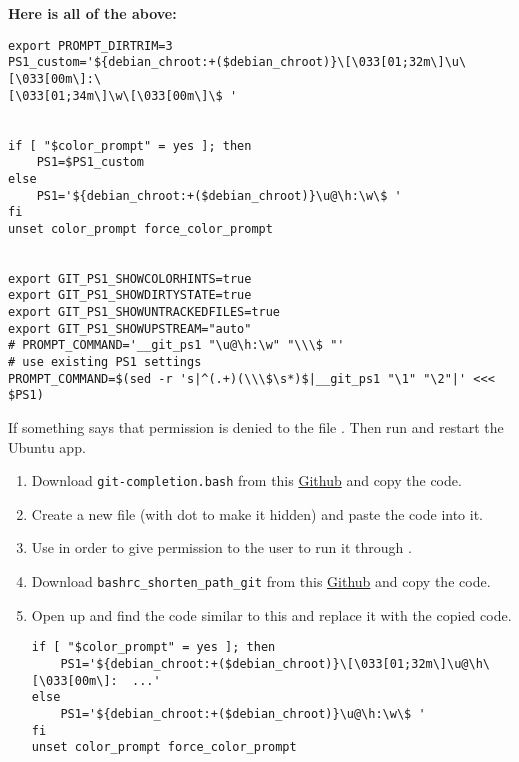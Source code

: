 \newpage
\textbf{Here is all of the above:}
\begin{verbatim}
export PROMPT_DIRTRIM=3
PS1_custom='${debian_chroot:+($debian_chroot)}\[\033[01;32m\]\u\[\033[00m\]:\
[\033[01;34m\]\w\[\033[00m\]\$ '


if [ "$color_prompt" = yes ]; then
    PS1=$PS1_custom
else
    PS1='${debian_chroot:+($debian_chroot)}\u@\h:\w\$ '
fi
unset color_prompt force_color_prompt


export GIT_PS1_SHOWCOLORHINTS=true
export GIT_PS1_SHOWDIRTYSTATE=true
export GIT_PS1_SHOWUNTRACKEDFILES=true
export GIT_PS1_SHOWUPSTREAM="auto"
# PROMPT_COMMAND='__git_ps1 "\u@\h:\w" "\\\$ "'
# use existing PS1 settings
PROMPT_COMMAND=$(sed -r 's|^(.+)(\\\$\s*)$|__git_ps1 "\1" "\2"|' <<< $PS1)
\end{verbatim}

If something says that permission is denied to the file . Then run  and restart the Ubuntu app.


\begin{enumerate}
    \item Download \texttt{git-completion.bash} from this \href{https://github.com/robinhellmers/computer_setup/tree/master/bash_path}{Github} and copy the code.
    
    \item Create a new file  (with dot to make it hidden) and paste the code into it.
    
    \item Use  in order to give permission to the user to run it through .
    
    \item Download \texttt{bashrc\_shorten\_path\_git} from this \href{https://github.com/robinhellmers/computer_setup/tree/master/bash_path}{Github} and copy the code.
    
    \item Open up  and find the code similar to this and replace it with the copied code.
\begin{verbatim}
if [ "$color_prompt" = yes ]; then
    PS1='${debian_chroot:+($debian_chroot)}\[\033[01;32m\]\u@\h\[\033[00m\]:  ...'
else
    PS1='${debian_chroot:+($debian_chroot)}\u@\h:\w\$ '
fi
unset color_prompt force_color_prompt
\end{verbatim}
    
    
\end{enumerate}





